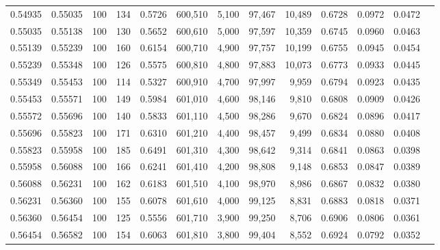\begin{tabular}{rrrrrrrrrrrrr}
0.54935 & 0.55035 &    100 & 134 &                                     0.5726 & 600,510 &   5,100 &  97,467 &  10,489 & 0.6728 & 0.0972 & 0.0472 \\
0.55035 & 0.55138 &    100 & 130 &                                     0.5652 & 600,610 &   5,000 &  97,597 &  10,359 & 0.6745 & 0.0960 & 0.0463 \\
0.55139 & 0.55239 &    100 & 160 &                                     0.6154 & 600,710 &   4,900 &  97,757 &  10,199 & 0.6755 & 0.0945 & 0.0454 \\
0.55239 & 0.55348 &    100 & 126 &                                     0.5575 & 600,810 &   4,800 &  97,883 &  10,073 & 0.6773 & 0.0933 & 0.0445 \\
0.55349 & 0.55453 &    100 & 114 &                                     0.5327 & 600,910 &   4,700 &  97,997 &   9,959 & 0.6794 & 0.0923 & 0.0435 \\
0.55453 & 0.55571 &    100 & 149 &                                     0.5984 & 601,010 &   4,600 &  98,146 &   9,810 & 0.6808 & 0.0909 & 0.0426 \\
0.55572 & 0.55696 &    100 & 140 &                                     0.5833 & 601,110 &   4,500 &  98,286 &   9,670 & 0.6824 & 0.0896 & 0.0417 \\
0.55696 & 0.55823 &    100 & 171 &                                     0.6310 & 601,210 &   4,400 &  98,457 &   9,499 & 0.6834 & 0.0880 & 0.0408 \\
0.55823 & 0.55958 &    100 & 185 &                                     0.6491 & 601,310 &   4,300 &  98,642 &   9,314 & 0.6841 & 0.0863 & 0.0398 \\
0.55958 & 0.56088 &    100 & 166 &                                     0.6241 & 601,410 &   4,200 &  98,808 &   9,148 & 0.6853 & 0.0847 & 0.0389 \\
0.56088 & 0.56231 &    100 & 162 &                                     0.6183 & 601,510 &   4,100 &  98,970 &   8,986 & 0.6867 & 0.0832 & 0.0380 \\
0.56231 & 0.56360 &    100 & 155 &                                     0.6078 & 601,610 &   4,000 &  99,125 &   8,831 & 0.6883 & 0.0818 & 0.0371 \\
0.56360 & 0.56454 &    100 & 125 &                                     0.5556 & 601,710 &   3,900 &  99,250 &   8,706 & 0.6906 & 0.0806 & 0.0361 \\
0.56454 & 0.56582 &    100 & 154 &                                     0.6063 & 601,810 &   3,800 &  99,404 &   8,552 & 0.6924 & 0.0792 & 0.0352 \\

\end{tabular}
